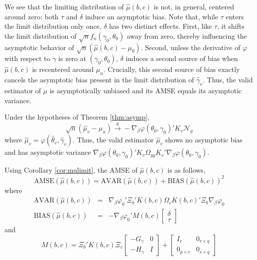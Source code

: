 We see that the limiting distribution of $\widehat{\mu}(b,c)$ is not, in general, centered around zero: both $\tau$ and $\delta$ induce an asymptotic bias. 
Note that, while $\tau$ enters the limit distribution only once, $\delta$ has two distinct effects. 
First, like $\tau$, it shifts the limit distribution of $\sqrt{n}f_n(\gamma_0, \theta_0)$ away from zero, thereby influencing the asymptotic behavior of $\sqrt{n}\left(\widehat{\mu}(b,c) - \mu_0 \right)$. 
Second, unless the derivative of $\varphi$ with respect to $\gamma$ is zero at $(\gamma_0, \theta_0)$, $\delta$ induces a second source of bias when $\widehat{\mu}(b,c)$ is recentered around $\mu_n$. 
Crucially, this second source of bias exactly cancels the asymptotic bias present in the limit distribution of $\widehat{\gamma}_v$. 
Thus, the valid estimator of $\mu$ is asymptotically unbiased and its AMSE equals its asymptotic variance.
\begin{cor}
\label{cor:muvalid}
Under the hypotheses of Theorem \ref{thm:asymp},
	$$\sqrt{n}\left( \widehat{\mu}_v - \mu_n\right) \overset{d}{\rightarrow} -\nabla_\beta \varphi(\theta_0, \gamma_0)' K_v\mathscr{N}_g$$
where $\widehat{\mu}_v = \varphi(\widehat{\theta}_v,\widehat{\gamma}_v)$. Thus, the valid estimator $\widehat{\mu}_v$ shows no asymptotic bias and has asymptotic variance $\nabla_\beta \varphi(\theta_0, \gamma_0)'K_v \Omega_{gg}K_v'\nabla_\beta \varphi(\theta_0, \gamma_0)$.
\end{cor}
 
Using Corollary \ref{cor:mulimit}, the AMSE of $\widehat{\mu}(b,c)$ is as follows,
	\begin{equation}
	\label{eq:AMSE}
		\mbox{AMSE}\left(\widehat{\mu}(b,c)\right) = \mbox{AVAR}\left(\widehat{\mu}\left(b,c\right)\right)  + \mbox{BIAS}\left(\widehat{\mu}\left(b,c\right)\right)^2
	\end{equation}
where
	\begin{eqnarray}
		\mbox{AVAR}\left(\widehat{\mu}\left(b,c\right)\right) &=& \nabla_\beta\varphi_0'\Xi_b '  K(b,c)\Omega_c K(b,c)'\Xi_b\nabla_\beta\varphi_0\\
		\mbox{BIAS}\left(\widehat{\mu}\left(b,c\right)\right) &=& -\nabla_{\beta} \varphi_0' M(b,c)\left[\begin{array}{c} \delta \\ \tau\end{array} \right]
		\label{eq:bias}
\end{eqnarray}
and
\begin{equation}
	M(b,c) = \Xi_b'K(b,c) \Xi_c \left[\begin{array}{cc} -G_\gamma & 0 \\ -H_\gamma & I \end{array} \right] +\left[\begin{array}{ll} I_r & 0_{r\times q} \\ 0_{p\times r} & 0_{s\times q} \end{array} \right]
\end{equation}

